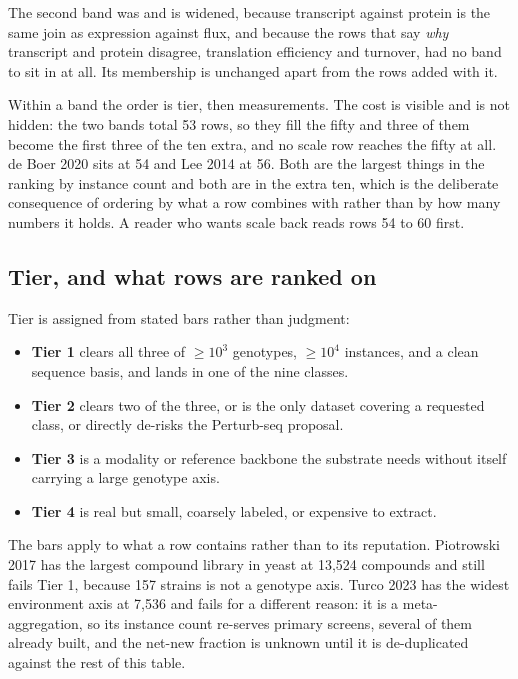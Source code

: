 The second band was  and is widened, because transcript
against protein is the same join as expression against flux, and because the rows that say
\emph{why} transcript and protein disagree, translation efficiency and turnover, had no
band to sit in at all. Its membership is unchanged apart from the rows added with it.

Within a band the order is tier, then measurements. The cost is visible and is not hidden:
the two bands total 53 rows, so they fill the fifty and three of them become the first
three of the ten extra, and no scale row reaches the fifty at all. de Boer 2020 sits at 54
and Lee 2014 at 56. Both are the largest things in the ranking by instance count and both
are in the extra ten, which is the deliberate consequence of ordering by what a row
combines with rather than by how many numbers it holds. A reader who wants scale back
reads rows 54 to 60 first.

\subsection{Tier, and what rows are ranked on}

Tier is assigned from stated bars rather than judgment:

\begin{itemize}[leftmargin=1.2em,itemsep=1pt,topsep=2pt]
  \item \textbf{Tier 1} clears all three of $\geq$$10^3$ genotypes, $\geq$$10^4$ instances,
    and a clean sequence basis, and lands in one of the nine classes.
  \item \textbf{Tier 2} clears two of the three, or is the only dataset covering a
    requested class, or directly de-risks the Perturb-seq proposal.
  \item \textbf{Tier 3} is a modality or reference backbone the substrate needs without
    itself carrying a large genotype axis.
  \item \textbf{Tier 4} is real but small, coarsely labeled, or expensive to extract.
\end{itemize}

The bars apply to what a row contains rather than to its reputation. Piotrowski 2017 has
the largest compound library in yeast at 13,524 compounds and still fails Tier 1, because
157 strains is not a genotype axis. Turco 2023 has the widest environment axis at 7,536 and
fails for a different reason: it is a meta-aggregation, so its instance count re-serves
primary screens, several of them already built, and the net-new fraction is unknown until
it is de-duplicated against the rest of this table.

